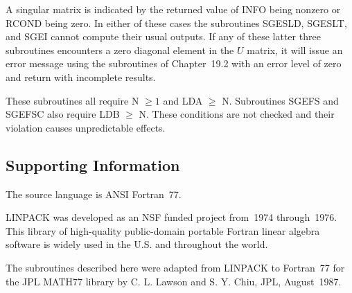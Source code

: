 \documentclass[twoside]{MATH77}
\begin{document}
A singular matrix is indicated by the returned value of INFO being nonzero
or RCOND being zero. In either of these cases the subroutines SGESLD,
SGESLT, and SGEI cannot compute their usual outputs. If any of these latter
three subroutines encounters a zero diagonal element in the $U$ matrix, it
will issue an error message using the subroutines of Chapter~19.2
with an error level of zero and return with incomplete results.

These subroutines all require N $\geq 1$ and LDA $\geq $ N. Subroutines SGEFS
and SGEFSC also require LDB $\geq $ N. These conditions are not checked and
their violation causes unpredictable effects.

\subsection{Supporting Information}

The source language is ANSI Fortran~77.

LINPACK was developed as an NSF funded project from~1974 through~1976. This
library of high-quality public-domain portable Fortran linear algebra
software is widely used in the U.S. and throughout the world.

The subroutines described here were adapted from LINPACK to Fortran~77 for
the JPL MATH77 library by C. L. Lawson and S. Y. Chiu, JPL, August~1987.
\end{document}
